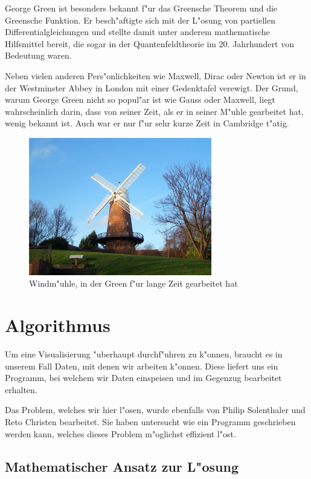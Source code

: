 \begin{refsection}
George Green ist besonders bekannt f"ur das Greensche Theorem und
die Greensche Funktion. Er besch"aftigte sich mit der L"osung von
partiellen Differentialgleichungen und stellte damit unter anderem
mathematische Hilfsmittel bereit, die sogar in der Quantenfeldtheorie
im 20. Jahrhundert von Bedeutung waren.\cite{wiki:green}
	
Neben vielen anderen Pers"onlichkeiten wie Maxwell, Dirac oder
Newton ist er in der Westminster Abbey in London mit einer Gedenktafel
verewigt\cite{wiki:westminster}. Der Grund, warum George Green nicht
so popul"ar ist wie Gauss oder Maxwell, liegt wahrscheinlich darin,
dass von seiner Zeit, als er in seiner M"uhle gearbeitet hat, wenig
bekannt ist. Auch war er nur f"ur sehr kurze Zeit in Cambridge
t"atig.

\begin{figure}                    
\centering 
\includegraphics[width=8cm]{green/images/greens_windmill.jpg} 
\caption{Windm"uhle, in der Green f"ur lange Zeit gearbeitet hat} 
\label{fig:abb1} 
\end{figure} 
	
\section{Algorithmus}
Um eine Visualisierung "uberhaupt durchf"uhren zu k"onnen, braucht
es in unserem Fall Daten, mit denen wir arbeiten k"onnen. Diese
liefert uns ein Programm, bei welchem wir Daten einspeisen und im
Gegenzug bearbeitet erhalten.
	
Das Problem, welches wir hier l"osen, wurde ebenfalls von Philip
Solenthaler und Reto Christen bearbeitet. Sie haben untersucht wie
ein Programm geschrieben werden kann, welches dieses Problem
m"oglichst effizient l"ost.

\subsection{Mathematischer Ansatz zur L"osung}


\end{refsection}
